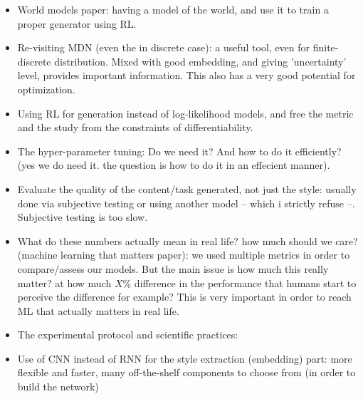 \begin{itemize}
    \item World models paper: having a model of the world, and use it to train a proper generator using RL.

    \item Re-visiting MDN (even the in discrete case): a useful tool, even for finite-discrete distribution. Mixed with good embedding, and giving 'uncertainty' level, provides important information. This also has a very good potential for optimization.

    \item Using RL for generation instead of log-likelihood models, and free the metric and the study from the constraints of differentiability.
    \item The hyper-parameter tuning: Do we need it? And how to do it efficiently? (yes we do need it. the question is how to do it in an effecient manner).

    \item Evaluate the quality of the content/task generated, not just the style: usually done via subjective testing or using another model -- which i strictly refuse --. Subjective testing is too slow.

    \item What do these numbers actually mean in real life? how much should we care? \cite{wagstaff2012machine} (machine learning that matters paper): we used multiple metrics in order to compare/assess our models. But the main issue is how much this really matter? at how much $X\%$ difference in the performance that humans start to perceive the difference for example? This is very important in order to reach ML that actually matters in real life.

    \item The experimental protocol and scientific practices:

    \item Use of CNN instead of RNN for the style extraction (embedding) part: more flexible and faster, many off-the-shelf components to choose from (in order to build the network)
\end{itemize}
